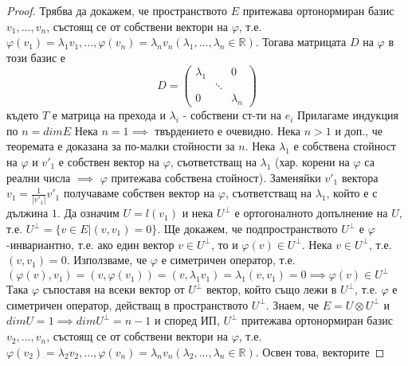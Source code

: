 \documentclass{article}
\begin{document}
\begin{proof}
Трябва да докажем, че пространството $E$ притежава ортонормиран базис $v_1, ..., v_n$, състоящ се от собствени вектори на
$\varphi$, т.е. $\varphi(v_1) = \lambda_1v_1, ..., \varphi(v_n) = \lambda_nv_n (\lambda_1, ..., \lambda_n \in \mathbb{R})$.
Тогава матрицата $D$ на $\varphi$ в този базис е $$D = \begin{pmatrix} \lambda_1 & & 0 \\ & \ddots & \\ 0 & & \lambda_n \end{pmatrix}$$
където $T$ е матрица на прехода и $\lambda_i$ - собствени ст-ти на $e_i$ \newline\newline
Прилагаме индукция по $n = dimE$ \newline
Нека $n = 1 \implies$ твърдението е очевидно. \newline
Нека $n > 1$ и доп., че теоремата е доказана за по-малки стойности за $n$. \newline\newline Нека $\lambda_1$ е собствена стойност на
$\varphi$ и $v'_1$ е собствен вектор на $\varphi$, съответстващ на $\lambda_1$ (хар. корени на $\varphi$ са реални числа
$\implies$ $\varphi$ притежава собствена стойност). Заменяйки $v'_1$ вектора $v_1 = \frac{1}{|v'_1|}v'_1$ получаваме собствен
вектор на $\varphi$, съответстващ на $\lambda_1$, който е с дължина $1$. \newline Да означим $U = l(v_1)$ и нека $U^{\perp}$
е ортогоналното допълнение на $U$, т.е. $U^{\perp} = \{v \in E | (v, v_1) = 0\}$.
Ще докажем, че подпространството $U^{\perp}$ е $\varphi$-инвариантно, т.е. ако един вектор $v \in U^{\perp}$, то и
$\varphi(v) \in U^{\perp}$. \newline\newline
Нека $v \in U^{\perp}$, т.е. $(v, v_1) = 0$. Използваме, че $\varphi$ е симетричен оператор, т.е. $(\varphi(v), v_1) =
(v, \varphi(v_1)) = (v, \lambda_1v_1) = \lambda_1(v, v_1) = 0 \implies \varphi(v) \in U^{\perp}$ \newline
Така $\varphi$ съпоставя на всеки вектор от $U^{\perp}$ вектор, който също лежи в $U^{\perp}$, т.е. $\varphi$ е симетричен
оператор, действащ в пространството $U^{\perp}$. Знаем, че $E = U \otimes U^{\perp}$ и $dimU = 1 \implies dimU^{\perp} = n - 1$
и според ИП, $U^{\perp}$ притежава ортонормиран базис $v_2, ..., v_n$, състоящ се от собствени вектори на $\varphi$, т.е.
$\varphi(v_2) = \lambda_2v_2, ..., \varphi(v_n) = \lambda_nv_n (\lambda_2, ..., \lambda_n \in \mathbb{R})$. Освен това, векторите

\end{proof}
\end{document}
